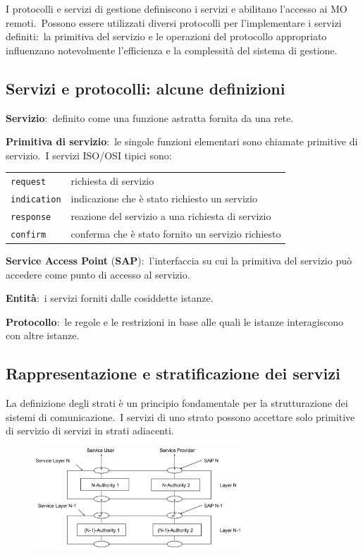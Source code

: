 I protocolli e servizi di gestione definiscono i servizi e abilitano l'accesso ai MO remoti.\
Possono essere utilizzati diversi protocolli per l'implementare i servizi definiti:\ la primitiva del servizio e le operazioni del protocollo appropriato influenzano notevolmente l'efficienza e la complessità del sistema di gestione.

\subsection{Servizi e protocolli: alcune definizioni}

\textbf{Servizio}:\ definito come una funzione astratta fornita da una rete.

\noindent\textbf{Primitiva di servizio}:\ le singole funzioni elementari sono chiamate primitive di servizio.\
I servizi ISO/OSI tipici sono:
\begin{table}[H]
    \centering
    \begin{tabular}{l l}
        \texttt{request}    & richiesta di servizio                              \\
        \texttt{indication} & indicazione che è stato richiesto un servizio      \\
        \texttt{response}   & reazione del servizio a una richiesta di servizio  \\
        \texttt{confirm}    & conferma che è stato fornito un servizio richiesto \\
    \end{tabular}
\end{table}
\noindent\textbf{Service Access Point} (\textbf{SAP}):\ l'interfaccia su cui la primitiva del servizio può accedere come punto di accesso al servizio.

\noindent\textbf{Entità}:\ i servizi forniti dalle cosiddette istanze.

\noindent\textbf{Protocollo}:\ le regole e le restrizioni in base alle quali le istanze interagiscono con altre istanze.

\subsection{Rappresentazione e stratificazione dei servizi}

La definizione degli strati è un principio fondamentale per la strutturazione dei sistemi di comunicazione.\
I servizi di uno strato possono accettare solo primitive di servizio di servizi in strati adiacenti.
\begin{figure}[H]
    \centering
    \includegraphics[width=0.7\textwidth]{immagini/Layering_services.png}

\end{figure}

